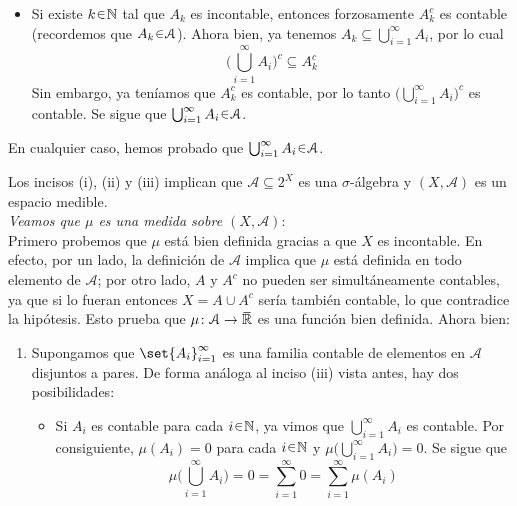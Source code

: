 \begin{sol}
\begin{enumerate}[label=(\roman*)]
\begin{itemize}
    \item Si existe $k\en\mathbb{N}$ tal que $A_k$ es incontable, entonces forzosamente $A_k^c$ es contable (recordemos que $A_k \en \mathcal{A}$). Ahora bien, ya tenemos $A_k \subseteq \bigcup^\infty_{i=1}A_i$, por lo cual
    \[
    \Big(\bigcup^\infty_{i=1}A_i\Big)^c \subseteq A^c_k
    \]
    Sin embargo, ya teníamos que $A^c_k$ es contable, por lo tanto $\big(\bigcup^\infty_{i=1}A_i\big)^c$ es contable. Se sigue que $\bigcup^\infty_{i=1}A_i \en \mathcal{A}$. 
\end{itemize}
En cualquier caso, hemos probado que $\bigcup^\infty_{i=1}A_i\en\mathcal{A}$.
\end{enumerate}
Los incisos (i), (ii) y (iii) implican que $\mathcal{A}\subseteq2^X$ es una $\sigma$-álgebra y $(X,\mathcal{A})$ es un espacio medible.\vspace{1em}\\
\emph{Veamos que $\mu$ es una medida sobre $(X,\mathcal{A})$}:\\
Primero probemos que $\mu$ está bien definida gracias a que $X$ es incontable. En efecto, por un lado, la definición de $\mathcal{A}$ implica que $\mu$ está definida en todo elemento de $\mathcal{A}$; por otro lado, $A$ y $A^c$ no pueden ser simultáneamente contables, ya que si lo fueran entonces $X = A \cup A^c$ sería también contable, lo que contradice la hipótesis. Esto prueba que $\mu \colon \mathcal{A} \to \ubar{\mathbb{R}}$ es una función bien definida. Ahora bien:
\begin{enumerate}[label=(\alph*)]
\item Supongamos que $\set{A_i}^\infty_{i=1}$ es una familia contable de elementos en $\mathcal{A}$ disjuntos a pares. De forma análoga al inciso (iii) vista antes, hay dos posibilidades:
\begin{itemize}
    \item Si $A_i$ es contable para cada $i\en\mathbb{N}$, ya vimos que $\bigcup^\infty_{i=1}A_i$ es contable. Por consiguiente, $\mu(A_i) = 0$ para cada $i\en\mathbb{N}$ y $\mu\big(\bigcup^\infty_{i=1}A_i\big) = 0$. Se sigue que
    \[
    \mu\Big( \bigcup^\infty_{i=1}A_i \Big) = 0 = \sum^\infty_{i=1} 0 = \sum^\infty_{i=1}\mu(A_i)
    \]


\end{itemize}
\end{enumerate}
\end{sol}
